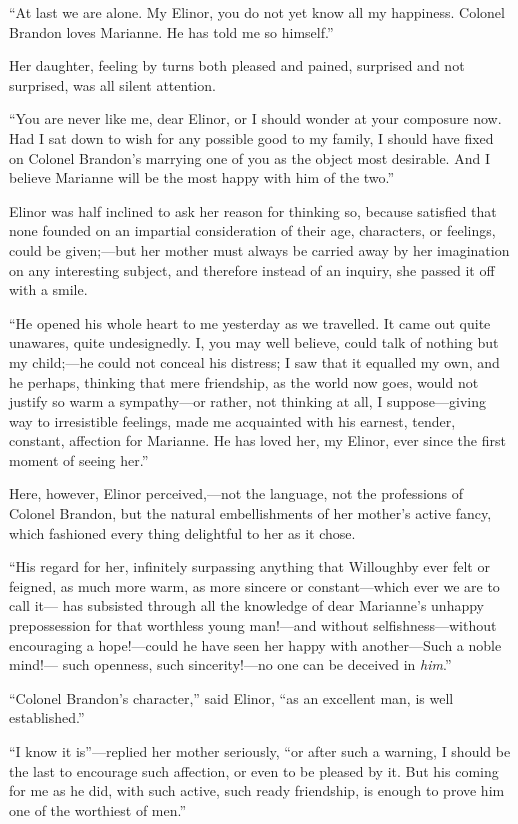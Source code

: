 \documentclass{article}
\begin{document}
``At last we are alone.  My Elinor, you do not yet
know all my happiness.  Colonel Brandon loves Marianne.
He has told me so himself.''

Her daughter, feeling by turns both pleased and pained,
surprised and not surprised, was all silent attention.

``You are never like me, dear Elinor, or I should
wonder at your composure now.  Had I sat down to wish
for any possible good to my family, I should have fixed
on Colonel Brandon's marrying one of you as the object
most desirable.  And I believe Marianne will be the most
happy with him of the two.''

Elinor was half inclined to ask her reason for thinking so,
because satisfied that none founded on an impartial
consideration of their age, characters, or feelings,
could be given;---but her mother must always be carried
away by her imagination on any interesting subject,
and therefore instead of an inquiry, she passed it off with a
smile.

``He opened his whole heart to me yesterday as we travelled.
It came out quite unawares, quite undesignedly.  I, you may
well believe, could talk of nothing but my child;---he could
not conceal his distress; I saw that it equalled my own,
and he perhaps, thinking that mere friendship, as the world
now goes, would not justify so warm a sympathy---or rather,
not thinking at all, I suppose---giving way to irresistible
feelings, made me acquainted with his earnest, tender, constant,
affection for Marianne.  He has loved her, my Elinor, ever since
the first moment of seeing her.''

Here, however, Elinor perceived,---not the language,
not the professions of Colonel Brandon, but the natural
embellishments of her mother's active fancy, which fashioned
every thing delightful to her as it chose.

``His regard for her, infinitely surpassing anything
that Willoughby ever felt or feigned, as much more warm,
as more sincere or constant---which ever we are to call it---%
has subsisted through all the knowledge of dear Marianne's
unhappy prepossession for that worthless young man!---and
without selfishness---without encouraging a hope!---could
he have seen her happy with another---Such a noble mind!---%
such openness, such sincerity!---no one can be deceived
in \emph{him}.''

``Colonel Brandon's character,'' said Elinor,
``as an excellent man, is well established.''

``I know it is''---replied her mother seriously, ``or
after such a warning, I should be the last to encourage
such affection, or even to be pleased by it.  But his coming
for me as he did, with such active, such ready friendship,
is enough to prove him one of the worthiest of men.''
\end{document}
